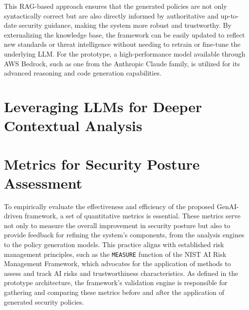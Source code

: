 This RAG-based approach ensures that the generated policies are not only syntactically correct but are also directly informed by authoritative and up-to-date security guidance, making the system more robust and trustworthy. By externalizing the knowledge base, the framework can be easily updated to reflect new standards or threat intelligence without needing to retrain or fine-tune the underlying LLM. For the prototype, a high-performance model available through AWS Bedrock, such as one from the Anthropic Claude family, is utilized for its advanced reasoning and code generation capabilities.


\section{Leveraging LLMs for Deeper Contextual Analysis} %
\label{sec:Leveraging LLMs for Deeper Contextual Analysis}



\section{Metrics for Security Posture Assessment} %
\label{sec:Metrics for Security Posture Assessment}

To empirically evaluate the effectiveness and efficiency of the proposed GenAI-driven framework, a set of quantitative metrics is essential. These metrics serve not only to measure the overall improvement in security posture but also to provide feedback for refining the system's components, from the analysis engines to the policy generation models. This practice aligns with established risk management principles, such as the \texttt{MEASURE} function of the NIST AI Risk Management Framework, which advocates for the application of methods to assess and track AI risks and trustworthiness characteristics. As defined in the prototype architecture, the framework's validation engine is responsible for gathering and comparing these metrics before and after the application of generated security policies.

